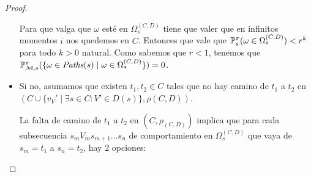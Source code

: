 \begin{proof}
\begin{itemize}
		      Para que valga que $\omega$ esté en $\Omega_s^{(C,D)}$ tiene que valer que en
		      infinitos momentos $i$ nos quedemos en $C$. Entonces que vale que $\mathbb{P}_s^\pi
			      (\omega \in \Omega_s^{(C,D)}) < r^k$ para todo $k > 0$ natural. Como sabemos
		      que $r < 1$, tenemos que $\mathbb{P}^\pi_{\mathcal{M}, s}(\{ \omega \in \textit{Paths}(s) \mid \omega
			      \in \Omega_s^{(C,D)}\}) = 0$.








		\item Si no, asumamos que existen $t_1, t_2 \in C$ tales que no hay camino de $t_1$ a
		      $t_2$ en $(C \cup \{v_V' \mid \exists s \in C : V' \in D(s)\}, \rho(C,D))$.

		      La falta de camino de $t_1$ a $t_2$ en $(C, \rho_{(C,D)})$ implica que para
		      cada subsecuencia $s_m V_m s_{m+1} ... s_n$ de comportamiento en
		      $\Omega_s^{(C,D)}$ que vaya de $s_m=t_1$ a $s_n=t_2$, hay 2 opciones:


\end{itemize}
\end{proof}
